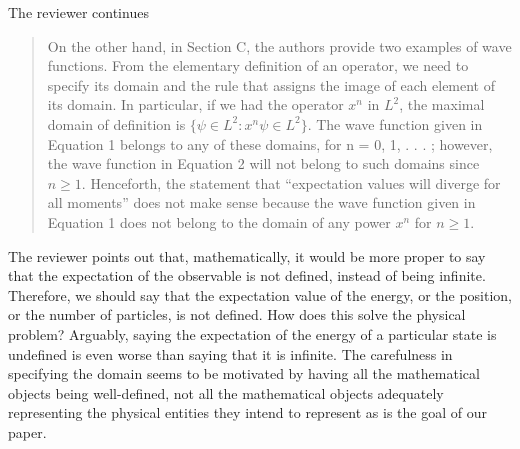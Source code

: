 \documentclass[11pt, executivepaper]{article}
\begin{document}
The reviewer continues
\begin{quote}
	On the other hand, in Section C, the authors provide two examples of wave
	functions. From the elementary definition of an operator, we need to specify its
	domain and the rule that assigns the image of each element of its domain. In
	particular, if we had the operator $x^n$ in $L^2$, the maximal domain of definition
	is $\{\psi \in L^2 : x^n \psi \in L^2\}$. The wave function given in Equation 1 belongs to any
	of these domains, for n = 0, 1, . . . ; however, the wave function in Equation 2
	will not belong to such domains since $n \geq 1$. Henceforth, the statement that
	``expectation values will diverge for all moments'' does not make sense because
	the wave function given in Equation 1 does not belong to the domain of any
	power $x^n$ for $n \geq 1$.
\end{quote}
The reviewer points out that, mathematically, it would be more proper to say that the expectation of the observable is not defined, instead of being infinite. Therefore, we should say that the expectation value of the energy, or the position, or the number of particles, is not defined. How does this solve the physical problem? Arguably, saying the expectation of the energy of a particular state is undefined is even worse than saying that it is infinite. The carefulness in specifying the domain seems to be motivated by having all the mathematical objects being well-defined, not all the mathematical objects adequately representing the physical entities they intend to represent as is the goal of our paper.
\end{document}
